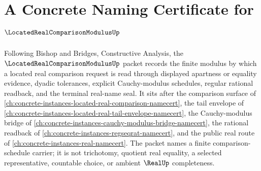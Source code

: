 \chapter{A Concrete Naming Certificate for $\LocatedRealComparisonModulusUp$}
\label{ch:concrete-instances-located-real-comparison-modulus-namecert}

Following Bishop and Bridges, Constructive Analysis, the $\LocatedRealComparisonModulusUp$ packet records the finite modulus by which a located real comparison request is read through displayed apartness or equality evidence, dyadic tolerances, explicit Cauchy-modulus schedules, regular rational readback, and the terminal real-name seal. It sits after the comparison surface of \autoref{ch:concrete-instances-located-real-comparison-namecert}, the tail envelope of \autoref{ch:concrete-instances-located-real-tail-envelope-namecert}, the Cauchy-modulus bridge of \autoref{ch:concrete-instances-cauchy-modulus-bridge-namecert}, the rational readback of \autoref{ch:concrete-instances-regseqrat-namecert}, and the public real route of \autoref{ch:concrete-instances-real-namecert}. The packet names a finite comparison-schedule carrier; it is not trichotomy, quotient real equality, a selected representative, countable choice, or ambient $\RealUp$ completeness.

